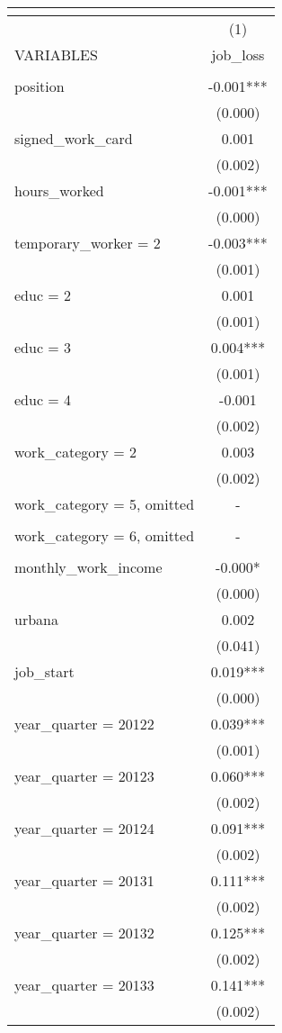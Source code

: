 \begin{tabular}{lc}
\multicolumn{2}{c}{} \\ \hline
 & (1) \\
VARIABLES & job\_loss \\ \hline
 &  \\
position & -0.001*** \\
 & (0.000) \\
signed\_work\_card & 0.001 \\
 & (0.002) \\
hours\_worked & -0.001*** \\
 & (0.000) \\
temporary\_worker = 2 & -0.003*** \\
 & (0.001) \\
educ = 2 & 0.001 \\
 & (0.001) \\
educ = 3 & 0.004*** \\
 & (0.001) \\
educ = 4 & -0.001 \\
 & (0.002) \\
work\_category = 2 & 0.003 \\
 & (0.002) \\
work\_category = 5, omitted & - \\
 &  \\
work\_category = 6, omitted & - \\
 &  \\
monthly\_work\_income & -0.000* \\
 & (0.000) \\
urbana & 0.002 \\
 & (0.041) \\
job\_start & 0.019*** \\
 & (0.000) \\
year\_quarter = 20122 & 0.039*** \\
 & (0.001) \\
year\_quarter = 20123 & 0.060*** \\
 & (0.002) \\
year\_quarter = 20124 & 0.091*** \\
 & (0.002) \\
year\_quarter = 20131 & 0.111*** \\
 & (0.002) \\
year\_quarter = 20132 & 0.125*** \\
 & (0.002) \\
year\_quarter = 20133 & 0.141*** \\
 & (0.002) \\

\end{tabular}
